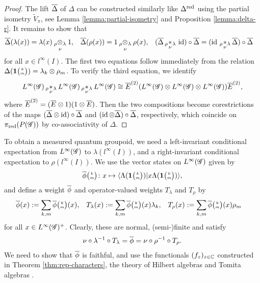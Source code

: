 \begin{proof}
The lift $\overline{\Delta}$ of $\Delta$ can be constructed similarly like  $\Delta^{\operatorname{\mathrm{red}}}$ using the partial isometry $\tilde V_{\pi}$, see Lemma \ref{lemma:partial-isometry} and Proposition \ref{lemma:delta-r}. It remains to show that
   \begin{align*}
     \overline{\Delta}(\lambda(x)) &= \lambda(x) \underset{\nu{}}{_{\rho}\otimes_{\lambda}} 1, &
  \overline{\Delta}(\rho(x)) &= 1 \underset{\nu{}}{_{\rho}\otimes_{\lambda}} \rho(x), &
  (\overline{\Delta} \,{}_{\rho}\!\underset{\nu}{\ast}\,\!\!_{\lambda}\, \operatorname{id})\circ \overline{\Delta} &= (\operatorname{id} \,{}_{\rho}\!\underset{\nu}{\ast}\,\!\!_{\lambda}\,
    \overline{\Delta}) \circ \overline{\Delta}
\end{align*}
for all $x\in l^{\infty}(I)$.
The first two equations follow immediately from the relation
$\Delta(\mathbf{1}{\tiny {\begin{pmatrix} k\\m\end{pmatrix}}})=\lambda_{k} \otimes \rho_{m}$. To verify
the third equation, we identify
\begin{align*}
 L^{\infty}(\mathscr{G}) \,{}_{\rho}\!\underset{\nu}{\ast}\,\!\!_{\lambda}\, L^{\infty}(\mathscr{G}) \,{}_{\rho}\!\underset{\nu}{\ast}\,\!\!_{\lambda}\, L^{\infty}(\mathscr{G}) \cong \overline{E}^{(2)}(L^{\infty}(\mathscr{G})
  \otimes L^{\infty}(\mathscr{G}) \otimes L^{\infty}(\mathscr{G}))\overline{E}^{(2)},
\end{align*}
where $\overline{E}^{(2)}=(\overline{E} \otimes 1)(1 \otimes \overline{E})$. Then the two
compositions  become corestrictions of the maps $(\overline{\Delta} \otimes
\operatorname{id})\circ \overline{\Delta}$ and $(\operatorname{id} \otimes \overline{\Delta})\circ \overline{\Delta}$,
respectively, which coincide on $\pi_{\operatorname{\mathrm{red}}}(P(\mathscr{G}))$ by
co-associativity of $\Delta$. 
\end{proof}

To obtain a measured quantum groupoid, we  need a left-invariant conditional expectation from  $L^{\infty}(\mathscr{G})$ to $\lambda(l^{\infty}(I))$, and a right-invariant conditional expectation to $\rho(l^{\infty}(I))$. We use the vector states on $L^{\infty}(\mathscr{G})$ given by
\begin{align*}
  \overline{\phi}{\tiny {\begin{pmatrix} k\\m\end{pmatrix}}} \colon x \mapsto \langle \Lambda(\mathbf{1}{\tiny {\begin{pmatrix} k\\m\end{pmatrix}}})|x \Lambda(\mathbf{1}{\tiny {\begin{pmatrix} k\\m\end{pmatrix}}})\rangle,
\end{align*}
and define a weight $\overline{\phi}$ and operator-valued weights  $T_{\lambda}$ and $T_{\rho}$ 
 by
\begin{align} \label{eq:vn-weights}
  \overline{\phi}(x) &:= \sum_{k,m} \overline{\phi}{\tiny {\begin{pmatrix} k\\m\end{pmatrix}}}(x), &
    T_{\lambda}(x)&:= \sum_{k,m}
\overline{\phi}{\tiny {\begin{pmatrix} k\\m\end{pmatrix}}}(x)\lambda_{k}, & 
T_{\rho}(x)&:=
    \sum_{k,m} \overline{\phi}{\tiny {\begin{pmatrix} k\\m\end{pmatrix}}}(x)\rho_{m}
\end{align}
for all $x\in L^{\infty}(\mathscr{G})^{+}$. Clearly, these   are normal, (semi-)finite and satisfy
\begin{align}\label{eq:wts-equal}
  \nu
\circ \lambda^{-1} \circ T_{\lambda} = \overline{\phi} = \nu \circ \rho^{-1}
\circ T_{\rho}.
\end{align}
We need to show that $\overline{\phi}$ is faithful, and use  the functionals $(f_{z})_{z\in \mathbb{C}}$ constructed in Theorem \ref{thm:rep-characters}, the theory of Hilbert algebras and Tomita algebras \cite{Taksak2}.


